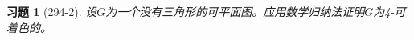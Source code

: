 \documentclass{article}
\begin{document}
\begin{CJK}{UTF8}{gbsn}
  \newtheorem*{Exercise}{习题}
  \huge
\begin{Exercise}[294-2]
  设$G$为一个没有三角形的可平面图。应用数学归纳法证明$G$为4-可着色的。
\end{Exercise}

\end{CJK}
\end{document}
